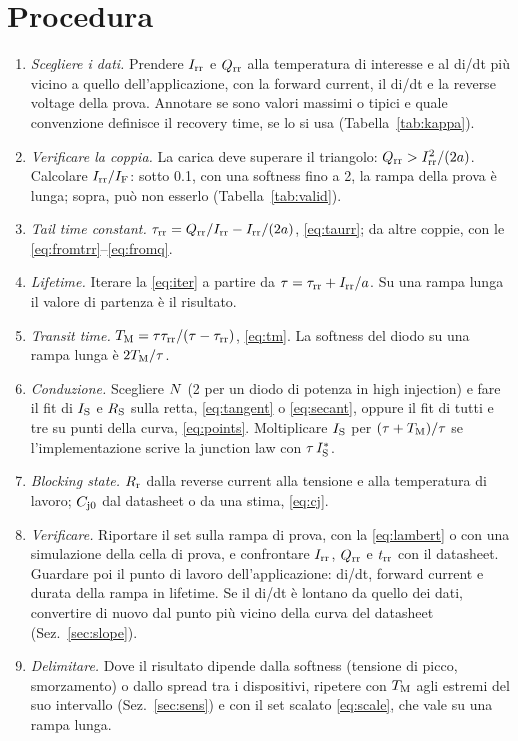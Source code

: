\documentclass[10pt,a4paper]{scrartcl}
\let\newcommand\pdvaluedefine
\newcommand{\IF}{I_\mathrm{F}}
\newcommand{\Irr}{I_\mathrm{rr}}
\newcommand{\Qrr}{Q_\mathrm{rr}}
\newcommand{\trr}{t_\mathrm{rr}}
\newcommand{\taurr}{\tau_\mathrm{rr}}
\newcommand{\TM}{T_\mathrm{M}}
\newcommand{\IS}{I_\mathrm{S}}
\newcommand{\RS}{R_\mathrm{S}}
\newcommand{\Rr}{R_\mathrm{r}}
\newcommand{\Cjo}{C_\mathrm{j0}}
\newcommand{\Nem}{N}                          %
\begin{document}
\section{Procedura}
\label{sec:procedure}
\begin{enumerate}
\item \emph{Scegliere i dati.} Prendere $\Irr$ e $\Qrr$ alla temperatura di interesse e al di/dt più vicino a quello dell'applicazione, con la forward current, il di/dt e la reverse voltage della prova. Annotare se sono valori massimi o tipici e quale convenzione definisce il recovery time, se lo si usa (Tabella~\ref{tab:kappa}).
\item \emph{Verificare la coppia.} La carica deve superare il triangolo: $\Qrr > \Irr^2/(2a)$. Calcolare $\Irr/\IF$: sotto \num{0.1}, con una softness fino a 2, la rampa della prova è lunga; sopra, può non esserlo (Tabella~\ref{tab:valid}).
\item \emph{Tail time constant.} $\taurr = \Qrr/\Irr - \Irr/(2a)$, \eqref{eq:taurr}; da altre coppie, con le \eqref{eq:fromtrr}--\eqref{eq:fromq}.
\item \emph{Lifetime.} Iterare la \eqref{eq:iter} a partire da $\tau = \taurr + \Irr/a$. Su una rampa lunga il valore di partenza è il risultato.
\item \emph{Transit time.} $\TM = \tau\taurr/(\tau-\taurr)$, \eqref{eq:tm}. La softness del diodo su una rampa lunga è $2\TM/\tau$.
\item \emph{Conduzione.} Scegliere $\Nem$ (2 per un diodo di potenza in high injection) e fare il fit di $\IS$ e $\RS$ sulla retta, \eqref{eq:tangent} o \eqref{eq:secant}, oppure il fit di tutti e tre su punti della curva, \eqref{eq:points}. Moltiplicare $\IS$ per $(\tau+\TM)/\tau$ se l'implementazione scrive la junction law con $\tau\,\IS^{*}$.
\item \emph{Blocking state.} $\Rr$ dalla reverse current alla tensione e alla temperatura di lavoro; $\Cjo$ dal datasheet o da una stima, \eqref{eq:cj}.
\item \emph{Verificare.} Riportare il set sulla rampa di prova, con la \eqref{eq:lambert} o con una simulazione della cella di prova, e confrontare $\Irr$, $\Qrr$ e $\trr$ con il datasheet. Guardare poi il punto di lavoro dell'applicazione: di/dt, forward current e durata della rampa in lifetime. Se il di/dt è lontano da quello dei dati, convertire di nuovo dal punto più vicino della curva del datasheet (Sez.~\ref{sec:slope}).
\item \emph{Delimitare.} Dove il risultato dipende dalla softness (tensione di picco, smorzamento) o dallo spread tra i dispositivi, ripetere con $\TM$ agli estremi del suo intervallo (Sez.~\ref{sec:sens}) e con il set scalato \eqref{eq:scale}, che vale su una rampa lunga.
\end{enumerate}
\end{document}
